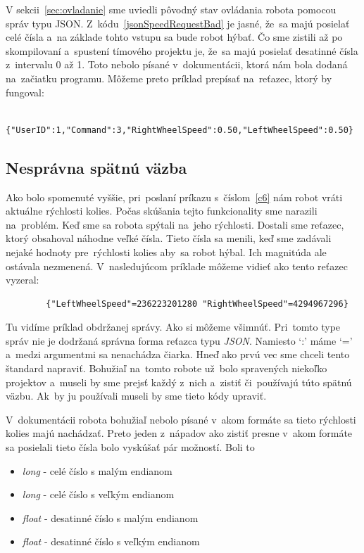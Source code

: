 V sekcii~\ref{sec:ovladanie} sme uviedli pôvodný stav ovládania robota pomocou správ typu JSON.
Z~kódu~\ref{jsonSpeedRequestBad} je jasné, že~sa majú posielať celé čísla a~na základe tohto vstupu sa bude robot hýbať. Čo sme zistili až
po skompilovaní a~spustení tímového projektu je, že~sa majú posielať desatinné čísla z~intervalu 0 až 1. Toto nebolo písané
v~dokumentácii, ktorá nám bola dodaná na~začiatku programu. Môžeme preto príklad prepísať na~reťazec, ktorý by fungoval:

	\label{jsonSpeedRequestGood}
	\begin{lstlisting}
			{"UserID":1,"Command":3,"RightWheelSpeed":0.50,"LeftWheelSpeed":0.50}
	\end{lstlisting}

\subsection{Nesprávna spätnú väzba}
\label{subsec:wrongFeedback}

Ako bolo spomenuté vyššie, pri~poslaní príkazu s~číslom~\ref{c6} nám robot vráti aktuálne rýchlosti kolies. Počas skúšania tejto funkcionality
sme narazili na~problém. Keď sme sa robota spýtali na~jeho rýchlosti. Dostali sme reťazec, ktorý obsahoval náhodne veľké čísla. Tieto čísla sa
menili, keď sme zadávali nejaké hodnoty pre~rýchlosti kolies aby~sa robot hýbal. Ich magnitúda ale ostávala nezmenená. V~nasledujúcom príklade
môžeme vidieť ako tento reťazec vyzeral:

\label{jsonWannabeSpeed}
\begin{lstlisting}
		{"LeftWheelSpeed"=236223201280 "RightWheelSpeed"=4294967296}
\end{lstlisting}

Tu vidíme príklad obdržanej správy. Ako si môžeme všimnúť. Pri~tomto type správ nie je dodržaná správna forma reťazca typu \textit{JSON}.
Namiesto `:' máme `=' a~medzi argumentmi sa nenachádza čiarka. Hneď ako prvú vec sme chceli tento štandard napraviť. Bohužiaľ na~tomto
robote už~bolo spravených niekoľko projektov a~museli by sme prejsť každý z~nich a~zistiť či~používajú túto spätnú väzbu. Ak~by ju používali
museli by sme tieto kódy upraviť.

V~dokumentácii robota bohužiaľ nebolo písané v~akom formáte sa tieto rýchlosti kolies majú nachádzať. Preto jeden z~nápadov ako zistiť presne
v~akom formáte sa posielali tieto čísla bolo vyskúšať pár možností. Boli to

\begin{itemize}
	\item \textit{long} - celé číslo s malým endianom
	\item \textit{long} - celé číslo s veľkým endianom
	\item \textit{float} - desatinné číslo s malým endianom
	\item \textit{float} - desatinné číslo s veľkým endianom
\end{itemize}


